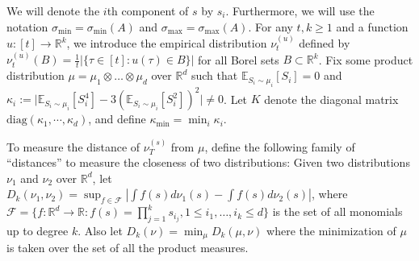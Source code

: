 \documentclass{article} %
\newcommand{\real}{\mathbb{R}}
\newcommand{\E}{\mathbb{E}}
\theoremstyle{definition}
\begin{document}
We will denote the $i$th component of $s$ by $s_i$. 
Furthermore, we will use the notation $\sigma_{\min}=\sigma_{\min}(A)$ and
$\sigma_{\max}=\sigma_{\max}(A)$.
For any $t,k \ge 1$ and a function $u:[t] \to \real^k$, we introduce the empirical distribution $\nu_t^{(u)}$ defined by
$\nu_t^{(u)}(B)=\tfrac{1}{t}|\{\tau \in [t]: u(\tau) \in B\}|$ for all Borel sets $B \subset \real^k$.
Fix some product distribution $\mu= \mu_1\otimes \ldots \otimes \mu_d$ over $\real^d$ 
such that $\E_{S_i\sim\mu_i}[S_i]=0$ and $\kappa_i := \vert \E_{S_i\sim \mu_i}[S_i^4] - 3\left(\E_{S_i\sim \mu_i}[S_i^2]\right)^2 \vert \neq 0$. Let
$K$ denote the diagonal matrix $\text{diag}(\kappa_1,\cdots,\kappa_d)$, and define $\kappa_{\min}=\min_{i} \kappa_i$.


To measure the distance of $\nu_T^{(s)}$ from $\mu$, define the following family of ``distances'' to measure the closeness of two distributions: Given two distributions $\nu_1$ and $\nu_2$ over $\real^d$, let $D_k(\nu_1,\nu_2) = \sup_{f\in\mathcal{F}} |\int f(s)d\nu_1(s) - \int f(s)d\nu_2(s)|$, where $\mathcal{F}=\{f:\real^d \to \real : f(s)=\prod_{j=1}^k s_{i_j}, 1 \le i_1,\ldots,i_k \le d\}$ is the set of all monomials up to degree $k$.
Also let $D_k(\nu)  = \min_{\mu} D_k(\mu, \nu)$ where the minimization of $\mu$ is taken over the set of all the product measures. 
\end{document}
